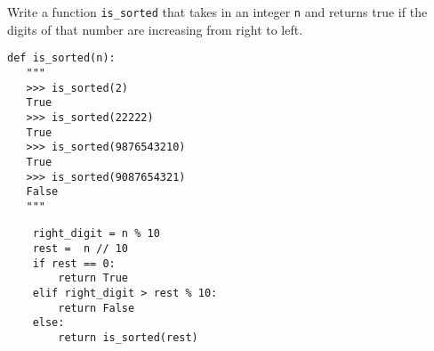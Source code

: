 \begin{blocksection}
\question Write a function \lstinline$is_sorted$ that takes in an integer
\lstinline$n$ and returns true if the digits of that number are increasing from
right to left.

\begin{lstlisting}
def is_sorted(n):
   """
   >>> is_sorted(2)
   True
   >>> is_sorted(22222)
   True
   >>> is_sorted(9876543210)
   True
   >>> is_sorted(9087654321)
   False
   """
\end{lstlisting}
\end{blocksection}


\begin{blocksection}
\begin{solution}[1in]
\begin{lstlisting}
    right_digit = n % 10
    rest =  n // 10
    if rest == 0:
        return True
    elif right_digit > rest % 10:
        return False
    else:
        return is_sorted(rest)
\end{lstlisting}
\end{solution}
\end{blocksection}
